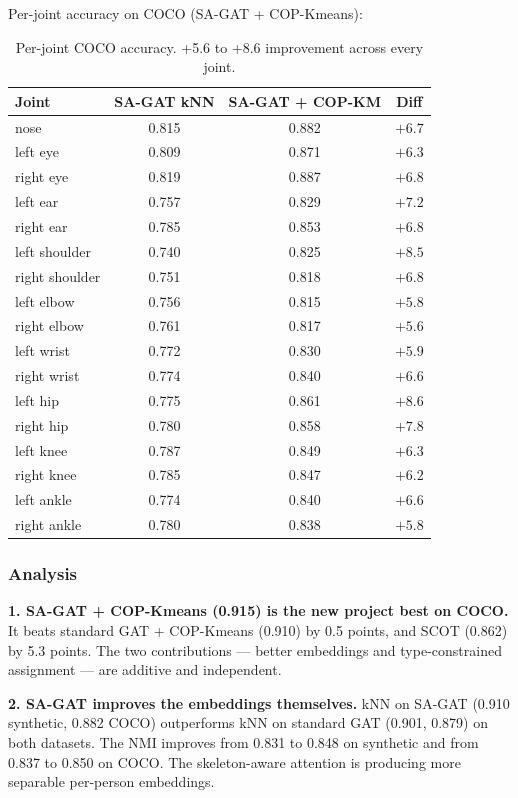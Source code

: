 Per-joint accuracy on COCO (SA-GAT + COP-Kmeans):

\begin{table}[H]
\centering
\footnotesize
\begin{tabular}{lccc}
\toprule
Joint & SA-GAT kNN & SA-GAT + COP-KM & Diff \\
\midrule
nose & 0.815 & 0.882 & $+6.7$ \\
left eye & 0.809 & 0.871 & $+6.3$ \\
right eye & 0.819 & 0.887 & $+6.8$ \\
left ear & 0.757 & 0.829 & $+7.2$ \\
right ear & 0.785 & 0.853 & $+6.8$ \\
left shoulder & 0.740 & 0.825 & $+8.5$ \\
right shoulder & 0.751 & 0.818 & $+6.8$ \\
left elbow & 0.756 & 0.815 & $+5.8$ \\
right elbow & 0.761 & 0.817 & $+5.6$ \\
left wrist & 0.772 & 0.830 & $+5.9$ \\
right wrist & 0.774 & 0.840 & $+6.6$ \\
left hip & 0.775 & 0.861 & $+8.6$ \\
right hip & 0.780 & 0.858 & $+7.8$ \\
left knee & 0.787 & 0.849 & $+6.3$ \\
right knee & 0.785 & 0.847 & $+6.2$ \\
left ankle & 0.774 & 0.840 & $+6.6$ \\
right ankle & 0.780 & 0.838 & $+5.8$ \\
\bottomrule
\end{tabular}
\caption{Per-joint COCO accuracy. +5.6 to +8.6 improvement across every joint.}
\end{table}


\subsubsection{Analysis}

\textbf{1. SA-GAT + COP-Kmeans (0.915) is the new project best on COCO.} It beats standard GAT + COP-Kmeans (0.910) by 0.5 points, and SCOT (0.862) by 5.3 points. The two contributions --- better embeddings and type-constrained assignment --- are additive and independent.

\textbf{2. SA-GAT improves the embeddings themselves.} kNN on SA-GAT (0.910 synthetic, 0.882 COCO) outperforms kNN on standard GAT (0.901, 0.879) on both datasets. The NMI improves from 0.831 to 0.848 on synthetic and from 0.837 to 0.850 on COCO. The skeleton-aware attention is producing more separable per-person embeddings.

